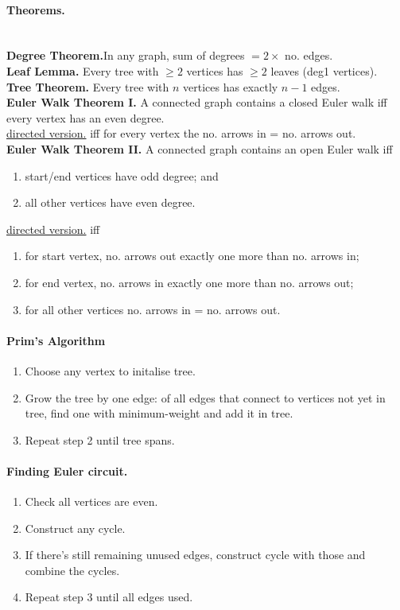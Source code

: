\documentclass[11pt,twocolumn]{scrartcl}
\begin{document}
\paragraph{Theorems.}\hfill\\
\textbf{Degree Theorem.}In any graph, sum of degrees $= 2\times$ no. edges.   \\
\textbf{Leaf Lemma.} Every tree with $\geq 2$ vertices has $\geq 2$ leaves (deg1 vertices).\\
\textbf{Tree Theorem.} Every tree with $n$ vertices has exactly $n-1$ edges.    \\
\textbf{Euler Walk Theorem I.} A connected graph contains a closed Euler walk iff every vertex has an even degree.\\
\underline{directed version.} iff for every vertex the no. arrows in = no. arrows out.   \\
\textbf{Euler Walk Theorem II.} A connected graph contains an open Euler walk iff
\begin{enumerate}[label=(\roman*)]
    \item start/end vertices have odd degree; and
    \item all other vertices have even degree.
\end{enumerate}
\underline{directed version.} iff
\begin{enumerate}[label=(\roman*)]
    \item for start vertex, no. arrows out exactly one more than no. arrows in;
    \item for end vertex, no. arrows in exactly one more than no. arrows out;
    \item for all other vertices no. arrows in = no. arrows out.
\end{enumerate}

\paragraph{Prim's Algorithm}
\begin{enumerate}
    \item Choose any vertex to initalise tree.
    \item Grow the tree by one edge: of all edges that connect to vertices not yet in tree, find one with minimum-weight and add it in tree.
    \item Repeat step 2 until tree spans.
\end{enumerate}

\paragraph{Finding Euler circuit.}
\begin{enumerate}
    \item Check all vertices are even.
    \item Construct any cycle.
    \item If there's still remaining unused edges, construct cycle with those and combine the cycles.
    \item Repeat step 3 until all edges used.
\end{enumerate}
\end{document}
